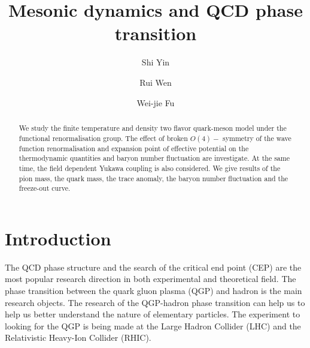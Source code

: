 \documentclass[%
reprint,
superscriptaddress,
showpacs,preprintnumbers,
 amsmath,amssymb,
 aps,
prd,
]{revtex4-1}
\begin{document}
\preprint{}

\title{Mesonic dynamics and QCD phase transition
}

\author{Shi Yin}

\author{Rui Wen}

\author{Wei-jie Fu}


\begin{abstract}
We study the finite temperature and density two flavor quark-meson model under the functional renormalisation group. The effect of broken $O(4)-$ symmetry of the wave function  renormalisation and expansion point of effective potential on the thermodynamic quantities and baryon number fluctuation are investigate. At the same time, the field dependent Yukawa coupling is also considered. We give results of the pion mass, the quark mass, the trace anomaly, the baryon number fluctuation and the freeze-out curve.
\end{abstract}

\maketitle



\section{Introduction}
\label{sec:int}


The QCD phase structure and the search of the critical end point (CEP) are the most popular research direction in both experimental and theoretical field. The phase transition between the quark gluon plasma (QGP) and hadron is the main research objects. The research of the QGP-hadron phase transition can help us to help us better understand the nature of elementary particles. The experiment to looking for the QGP is being made at the Large Hadron Collider (LHC) and the Relativistic Heavy-Ion Collider (RHIC).
\end{document}
